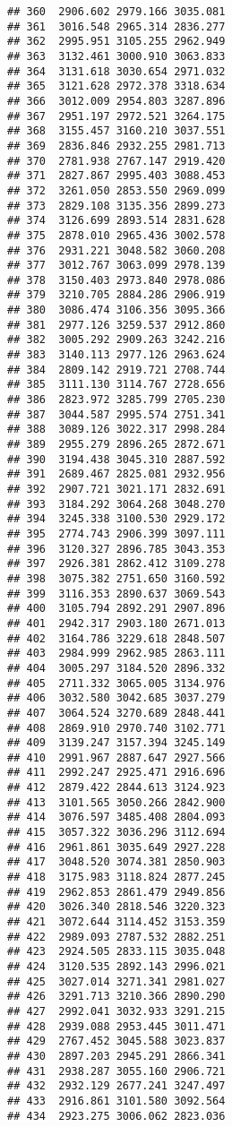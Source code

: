 \documentclass[
]{article}
\begin{document}
\begin{verbatim}
## 360  2906.602 2979.166 3035.081
## 361  3016.548 2965.314 2836.277
## 362  2995.951 3105.255 2962.949
## 363  3132.461 3000.910 3063.833
## 364  3131.618 3030.654 2971.032
## 365  3121.628 2972.378 3318.634
## 366  3012.009 2954.803 3287.896
## 367  2951.197 2972.521 3264.175
## 368  3155.457 3160.210 3037.551
## 369  2836.846 2932.255 2981.713
## 370  2781.938 2767.147 2919.420
## 371  2827.867 2995.403 3088.453
## 372  3261.050 2853.550 2969.099
## 373  2829.108 3135.356 2899.273
## 374  3126.699 2893.514 2831.628
## 375  2878.010 2965.436 3002.578
## 376  2931.221 3048.582 3060.208
## 377  3012.767 3063.099 2978.139
## 378  3150.403 2973.840 2978.086
## 379  3210.705 2884.286 2906.919
## 380  3086.474 3106.356 3095.366
## 381  2977.126 3259.537 2912.860
## 382  3005.292 2909.263 3242.216
## 383  3140.113 2977.126 2963.624
## 384  2809.142 2919.721 2708.744
## 385  3111.130 3114.767 2728.656
## 386  2823.972 3285.799 2705.230
## 387  3044.587 2995.574 2751.341
## 388  3089.126 3022.317 2998.284
## 389  2955.279 2896.265 2872.671
## 390  3194.438 3045.310 2887.592
## 391  2689.467 2825.081 2932.956
## 392  2907.721 3021.171 2832.691
## 393  3184.292 3064.268 3048.270
## 394  3245.338 3100.530 2929.172
## 395  2774.743 2906.399 3097.111
## 396  3120.327 2896.785 3043.353
## 397  2926.381 2862.412 3109.278
## 398  3075.382 2751.650 3160.592
## 399  3116.353 2890.637 3069.543
## 400  3105.794 2892.291 2907.896
## 401  2942.317 2903.180 2671.013
## 402  3164.786 3229.618 2848.507
## 403  2984.999 2962.985 2863.111
## 404  3005.297 3184.520 2896.332
## 405  2711.332 3065.005 3134.976
## 406  3032.580 3042.685 3037.279
## 407  3064.524 3270.689 2848.441
## 408  2869.910 2970.740 3102.771
## 409  3139.247 3157.394 3245.149
## 410  2991.967 2887.647 2927.566
## 411  2992.247 2925.471 2916.696
## 412  2879.422 2844.613 3124.923
## 413  3101.565 3050.266 2842.900
## 414  3076.597 3485.408 2804.093
## 415  3057.322 3036.296 3112.694
## 416  2961.861 3035.649 2927.228
## 417  3048.520 3074.381 2850.903
## 418  3175.983 3118.824 2877.245
## 419  2962.853 2861.479 2949.856
## 420  3026.340 2818.546 3220.323
## 421  3072.644 3114.452 3153.359
## 422  2989.093 2787.532 2882.251
## 423  2924.505 2833.115 3035.048
## 424  3120.535 2892.143 2996.021
## 425  3027.014 3271.341 2981.027
## 426  3291.713 3210.366 2890.290
## 427  2992.041 3032.933 3291.215
## 428  2939.088 2953.445 3011.471
## 429  2767.452 3045.588 3023.837
## 430  2897.203 2945.291 2866.341
## 431  2938.287 3055.160 2906.721
## 432  2932.129 2677.241 3247.497
## 433  2916.861 3101.580 3092.564
## 434  2923.275 3006.062 2823.036

\end{verbatim}
\end{document}
